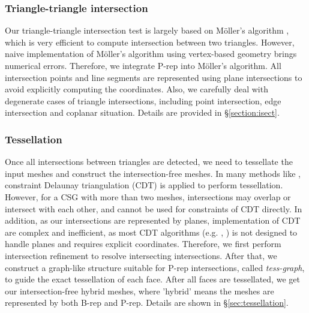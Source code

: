 \documentclass[10pt,journal,compsoc]{IEEEtran}
\begin{document}
\subsubsection{Triangle-triangle intersection}

Our triangle-triangle intersection test is largely based on M\"{o}ller's algorithm \cite{moller1997fast}, which is very efficient to compute intersection between two triangles. However, naive implementation of M\"{o}ller's algorithm using vertex-based geometry brings numerical errors. Therefore, we integrate P-rep into M\"{o}ller's algorithm. All intersection points and line segments are represented using plane intersections to avoid explicitly computing the coordinates. Also, we carefully deal with degenerate cases of triangle intersections, including point intersection, edge intersection and coplanar situation. Details are provided in \S\ref{section:isect}.

\subsubsection{Tessellation}

Once all intersections between triangles are detected, we need to tessellate the input meshes and construct the intersection-free meshes. In many methods like \cite{ogayar2015deferred}, constraint Delaunay triangulation (CDT) is applied to perform tessellation. However, for a CSG with more than two meshes, intersections may overlap or intersect with each other, and cannot be used for constraints of CDT directly. In addition, as our intersections are represented by planes, implementation of CDT are complex and inefficient, as most CDT algorithms (e.g. \cite{chew1989constrained}, \cite{de1992line}) is not designed to handle planes and requires explicit coordinates. Therefore, we first perform intersection refinement to resolve intersecting intersections. After that, we construct a graph-like structure suitable for P-rep intersections, called \emph{tess-graph}, to guide the exact tessellation of each face. After all faces are tessellated, we get our intersection-free hybrid meshes, where 'hybrid' means the meshes are represented by both B-rep and P-rep. Details are shown in \S\ref{sec:tessellation}.

\end{document}
